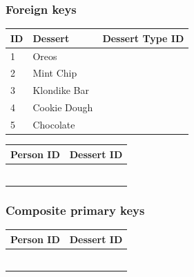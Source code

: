 \documentclass[aspectratio=169]{beamer}
\begin{document}
\begin{frame}
  \frametitle{Foreign keys}

  \begin{table}
    \footnotesize
    \begin{tabular}[T]{@{}lll@{}}
      \toprule
      ID & Dessert      & Dessert Type ID \\ \midrule
      1  & Oreos        & \color{red}{1}  \\
      2  & Mint Chip    & \color{red}{2}  \\
      3  & Klondike Bar & \color{red}{3}  \\
      4  & Cookie Dough & \color{red}{2}  \\
      5  & Chocolate    & \color{red}{2}  \\ \bottomrule
    \end{tabular}
  \end{table}
  \begin{table}[]
    \footnotesize
    \begin{tabular}{@{}ll@{}}
      \toprule
      Person ID         & Dessert ID        \\ \midrule
      \color{purple}{1} & \color{purple}{1} \\
      \color{purple}{1} & \color{purple}{2} \\
      \color{purple}{2} & \color{purple}{3} \\
      \color{purple}{3} & \color{purple}{2} \\
      \color{purple}{4} & \color{purple}{4} \\
      \color{purple}{5} & \color{purple}{5} \\ \bottomrule
    \end{tabular}
  \end{table}
\end{frame}

\begin{frame}
  \frametitle{Composite primary keys}
  \begin{table}[]
    \footnotesize
    \begin{tabular}{@{}ll@{}}
      \toprule
      Person ID         & Dessert ID        \\ \midrule
      \color{green}{1} & \color{green}{1} \\
      \color{green}{1} & \color{green}{2} \\
      \color{green}{2} & \color{green}{3} \\
      \color{green}{3} & \color{green}{2} \\
      \color{green}{4} & \color{green}{4} \\
      \color{green}{5} & \color{green}{5} \\ \bottomrule
    \end{tabular}
  \end{table}
\end{frame}
\end{document}
